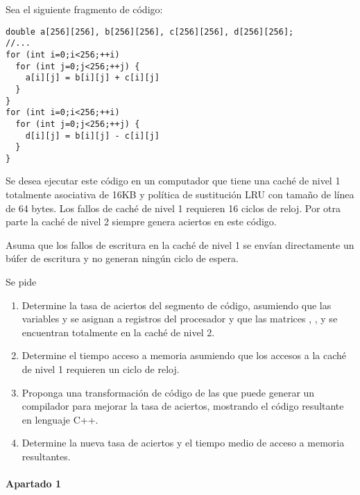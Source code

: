 \begin{acexercise}\end{acexercise}

Sea el siguiente fragmento de código:
\begin{lstlisting}
double a[256][256], b[256][256], c[256][256], d[256][256];
//...
for (int i=0;i<256;++i)
  for (int j=0;j<256;++j) {
    a[i][j] = b[i][j] + c[i][j]
  }
}
for (int i=0;i<256;++i)
  for (int j=0;j<256;++j) {
    d[i][j] = b[i][j] - c[i][j]
  }
}
\end{lstlisting}

Se desea ejecutar este código en un computador que tiene una caché de nivel 1
totalmente asociativa de 16KB y política de sustitución LRU con tamaño de línea
de 64 bytes. Los fallos de caché de nivel 1 requieren 16 ciclos de reloj. Por
otra parte la caché de nivel 2 siempre genera aciertos en este código.

Asuma que los fallos de escritura en la caché de nivel 1 se envían directamente
un búfer de escritura y no generan ningún ciclo de espera.

Se pide

\begin{enumerate}
  \item Determine la tasa de aciertos del segmento de código, asumiendo que las
variables  y  se asignan a registros del procesador y que las
matrices , ,  y  se encuentran totalmente
en la caché de nivel 2.

  \item Determine el tiempo acceso a memoria asumiendo que los accesos a la
caché de nivel 1 requieren un ciclo de reloj.

  \item Proponga una transformación de código de las que puede generar un
compilador para mejorar la tasa de aciertos, mostrando el código resultante en
lenguaje C++.

  \item Determine la nueva tasa de aciertos y el tiempo medio de acceso a
memoria resultantes.

\end{enumerate}


\begin{acsolution}\end{acsolution}

\paragraph{Apartado 1}

